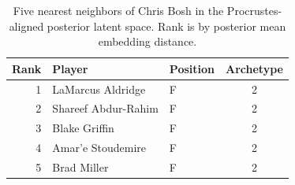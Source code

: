 \begin{table}[htbp]
  \centering\small
  \begin{tabular}{rllc}
    \toprule
    Rank & Player & Position & Archetype \\
    \midrule
    1 & LaMarcus Aldridge & F & 2 \\
    2 & Shareef Abdur-Rahim & F & 2 \\
    3 & Blake Griffin & F & 2 \\
    4 & Amar'e Stoudemire & F & 2 \\
    5 & Brad Miller & F & 2 \\
    \bottomrule
  \end{tabular}
  \caption{Five nearest neighbors of Chris Bosh in the Procrustes-aligned posterior latent space. Rank is by posterior mean embedding distance.}
\end{table}

